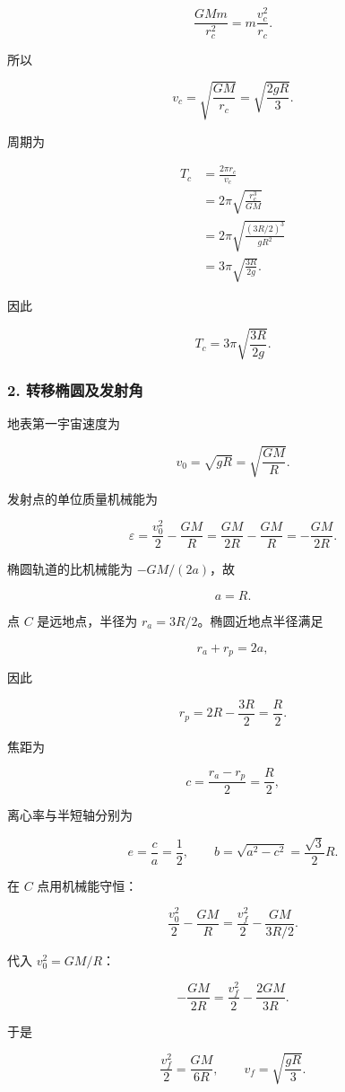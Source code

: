 \documentclass[12pt,a4paper,UTF8]{ctexart}
\begin{document}
\[
\frac{GMm}{r_c^2}=m\frac{v_c^2}{r_c}.
\]

所以

\[
v_c=\sqrt{\frac{GM}{r_c}}
=\sqrt{\frac{2gR}{3}}.
\]

周期为

\[
\begin{aligned}
T_c
&=\frac{2\pi r_c}{v_c}\\
&=2\pi\sqrt{\frac{r_c^3}{GM}}\\
&=2\pi\sqrt{\frac{(3R/2)^3}{gR^2}}\\
&=3\pi\sqrt{\frac{3R}{2g}}.
\end{aligned}
\]

因此

\[
\boxed{T_c=3\pi\sqrt{\frac{3R}{2g}}}.
\]

\subsubsection{2.
转移椭圆及发射角}\label{ux8f6cux79fbux692dux5706ux53caux53d1ux5c04ux89d2}

地表第一宇宙速度为

\[
v_0=\sqrt{gR}=\sqrt{\frac{GM}{R}}.
\]

发射点的单位质量机械能为

\[
\varepsilon
=\frac{v_0^2}{2}-\frac{GM}{R}
=\frac{GM}{2R}-\frac{GM}{R}
=-\frac{GM}{2R}.
\]

椭圆轨道的比机械能为 \(-GM/(2a)\)，故

\[
a=R.
\]

点 \(C\) 是远地点，半径为 \(r_a=3R/2\)。椭圆近地点半径满足

\[
r_a+r_p=2a,
\]

因此

\[
r_p=2R-\frac{3R}{2}=\frac{R}{2}.
\]

焦距为

\[
c=\frac{r_a-r_p}{2}=\frac{R}{2},
\]

离心率与半短轴分别为

\[
e=\frac{c}{a}=\frac12,
\qquad
b=\sqrt{a^2-c^2}=\frac{\sqrt3}{2}R.
\]

在 \(C\) 点用机械能守恒：

\[
\frac{v_0^2}{2}-\frac{GM}{R}
=\frac{v_f^2}{2}-\frac{GM}{3R/2}.
\]

代入 \(v_0^2=GM/R\)：

\[
-\frac{GM}{2R}
=\frac{v_f^2}{2}-\frac{2GM}{3R}.
\]

于是

\[
\frac{v_f^2}{2}=\frac{GM}{6R},
\qquad
\boxed{v_f=\sqrt{\frac{gR}{3}}}.
\]
\end{document}
